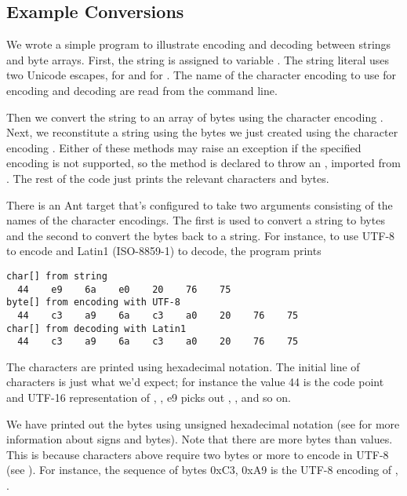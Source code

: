 \subsection{Example Conversions}

We wrote a simple program to illustrate encoding and decoding between
strings and byte arrays.  
%
%
First, the string  is
assigned to variable
.  The string literal uses two Unicode escapes, 
 for  and  for 
.  The name of the character encoding to use for
encoding and decoding are read from the command line.  

Then we convert the string  to an array of bytes
 using the character encoding .  Next, we
reconstitute a string using the bytes we just created using the
character encoding .  Either of these methods may raise
an exception if the specified encoding is not supported, so the 
 method is declared to throw an
, imported from .
The rest of the code just prints the relevant characters and bytes.

There is an Ant target  that's configured to take
two arguments consisting of the names of the character encodings.  The
first is used to convert a string to bytes and the second to convert
the bytes back to a string.  For instance, to use UTF-8 to encode and
Latin1 (ISO-8859-1) to decode, the program prints 
%
\begin{verbatim}
char[] from string
  44    e9    6a    e0    20    76    75
byte[] from encoding with UTF-8
  44    c3    a9    6a    c3    a0    20    76    75
char[] from decoding with Latin1
  44    c3    a9    6a    c3    a0    20    76    75
\end{verbatim}
%
The characters are printed using hexadecimal notation.  The initial
line of characters is just what we'd expect; for instance the
 value 44 is the code point and UTF-16 representation of
, ,  e9
picks out , , and so on.

We have printed out the bytes using unsigned hexadecimal notation (see
 for more information about signs and bytes).  
Note that there are more bytes than  values.  This is
because characters above  require two bytes or more to
encode in UTF-8 (see ).  For instance, the sequence of
bytes 0xC3, 0xA9 is the UTF-8 encoding of
, .


